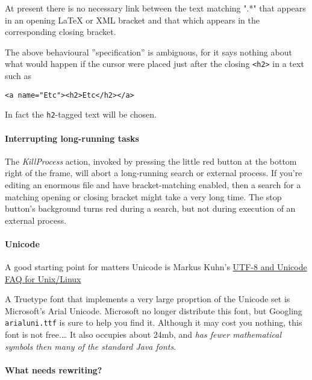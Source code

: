 \documentclass[
]{article}
\begin{document}
At present there is no necessary link between the text matching ".*"
that appears in an opening LaTeX or XML bracket and that which appears
in the corresponding closing bracket.

The above behavioural ''specification'' is ambiguous, for it says
nothing about what would happen if the cursor were placed just after the
closing \texttt{\textless{}h2\textgreater{}} in a text such as

\begin{verbatim}
<a name="Etc"><h2>Etc</h2></a>
\end{verbatim}

In fact the \texttt{h2}-tagged text will be chosen.

\hypertarget{interrupting-long-running-tasks}{%
\paragraph{Interrupting long-running
tasks}\label{interrupting-long-running-tasks}}

The \emph{KillProcess} action, invoked by pressing the little red button
at the bottom right of the frame, will abort a long-running search or
external process. If you're editing an enormous file and have
bracket-matching enabled, then a search for a matching opening or
closing bracket might take a very long time. The stop button's
background turns red during a search, but not during execution of an
external process.

\hypertarget{unicode}{%
\paragraph{Unicode}\label{unicode}}

A good starting point for matters Unicode is Markus Kuhn's
\href{http://www.cl.cam.ac.uk/~mgk25/unicode.html}{UTF-8 and Unicode FAQ
for Unix/Linux}

A Truetype font that implements a very large proprtion of the Unicode
set is Microsoft's Arial Unicode. Microsoft no longer distribute this
font, but Googling \texttt{arialuni.ttf} is sure to help you find it.
Although it may cost you nothing, this font is not free.\ldots{} It also
occupies about 24mb, and \emph{has fewer mathematical symbols then many
of the standard Java fonts}.

\hypertarget{what-needs-rewriting}{%
\paragraph{What needs rewriting?}\label{what-needs-rewriting}}
\end{document}
